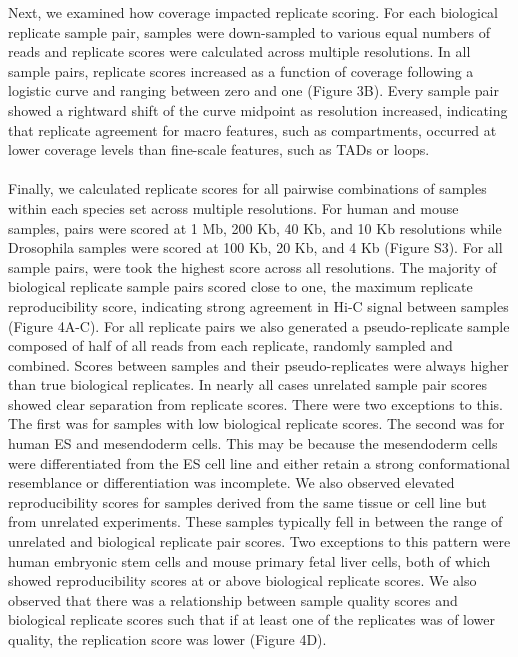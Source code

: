 
Next, we examined how coverage impacted replicate scoring. For each biological replicate sample pair, samples were down-sampled to various equal numbers of reads and replicate scores were calculated across multiple resolutions. In all sample pairs, replicate scores increased as a function of coverage following a logistic curve and ranging between zero and one (Figure 3B). Every sample pair showed a rightward shift of the curve midpoint as resolution increased, indicating that replicate agreement for macro features, such as compartments, occurred at lower coverage levels than fine-scale features, such as TADs or loops.
\\\\
Finally, we calculated replicate scores for all pairwise combinations of samples within each species set across multiple resolutions. For human and mouse samples, pairs were scored at 1 Mb, 200 Kb, 40 Kb, and 10 Kb resolutions while Drosophila samples were scored at 100 Kb, 20 Kb, and 4 Kb (Figure S3). For all sample pairs, were took the highest score across all resolutions. The majority of biological replicate sample pairs scored close to one, the maximum replicate reproducibility score, indicating strong agreement in Hi-C signal between samples (Figure 4A-C). For all replicate pairs we also generated a pseudo-replicate sample composed of half of all reads from each replicate, randomly sampled and combined. Scores between samples and their pseudo-replicates were always higher than true biological replicates. In nearly all cases unrelated sample pair scores showed clear separation from replicate scores. There were two exceptions to this. The first was for samples with low biological replicate scores. The second was for human ES and mesendoderm cells. This may be because the mesendoderm cells were differentiated from the ES cell line and either retain a strong conformational resemblance or differentiation was incomplete. We also observed elevated reproducibility scores for samples derived from the same tissue or cell line but from unrelated experiments. These samples typically fell in between the range of unrelated and biological replicate pair scores. Two exceptions to this pattern were human embryonic stem cells and mouse primary fetal liver cells, both of which showed reproducibility scores at or above biological replicate scores. We also observed that there was a relationship between sample quality scores and biological replicate scores such that if at least one of the replicates was of lower quality, the replication score was lower (Figure 4D).

